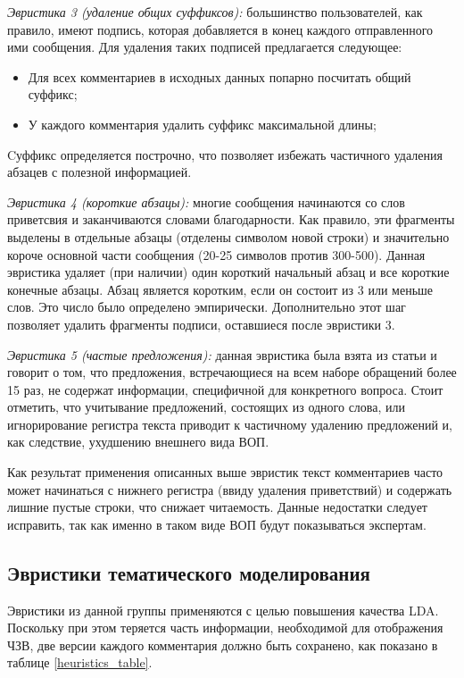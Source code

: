 \textit{Эвристика 3 (удаление общих суффиксов):} большинство пользователей, как правило, имеют подпись, которая добавляется в конец каждого отправленного ими сообщения. Для удаления таких подписей предлагается следующее:
 \begin{itemize}
\item Для всех комментариев в исходных данных попарно посчитать общий суффикс;
\item У каждого комментария удалить суффикс максимальной длины;
\end{itemize}
Cуффикс определяется построчно, что позволяет избежать частичного удаления абзацев с полезной информацией.

\textit{Эвристика 4 (короткие абзацы):} многие сообщения начинаются со слов приветсвия и заканчиваются словами благодарности. Как правило, эти фрагменты выделены в отдельные абзацы (отделены символом новой строки) и значительно короче основной части сообщения (20-25 символов против 300-500). Данная эвристика удаляет (при наличии) один короткий начальный абзац и все короткие конечные абзацы. Абзац является коротким, если он состоит из 3 или меньше слов. Это число было определено эмпирически. Дополнительно этот шаг позволяет удалить фрагменты подписи, оставшиеся после эвристики 3.

\textit{Эвристика 5 (частые предложения):} данная эвристика была взята из статьи \cite{original} и говорит о том, что предложения, встречающиеся на всем наборе обращений более 15 раз, не содержат информации, специфичной для конкретного вопроса. Стоит отметить, что учитывание предложений, состоящих из одного слова, или игнорирование регистра текста приводит к частичному удалению предложений и, как следствие, ухудшению внешнего вида ВОП.

Как результат применения описанных выше эвристик текст комментариев часто может начинаться с нижнего регистра (ввиду удаления приветствий) и содержать лишние пустые строки, что снижает читаемость. Данные недостатки следует исправить, так как именно в таком виде ВОП будут показываться экспертам.

\subsection{Эвристики тематического моделирования}
\label{subsec:ldaheur}

Эвристики из данной группы применяются с целью повышения качества LDA. Поскольку при этом теряется часть информации, необходимой для отображения ЧЗВ, две версии каждого комментария должно быть сохранено, как показано в таблице \ref{heuristics_table}.

